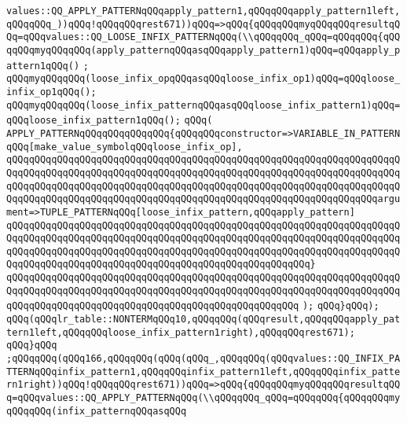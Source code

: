 \verb|values::QQ_APPLY_PATTERNqQQqapply_pattern1,qQQqqQQqapply_pattern1left,qQQqqQQq_))qQQq!qQQqqQQqrest671))qQQq=>qQQq{qQQqqQQqmyqQQqqQQqresultqQQq=qQQqvalues::QQ_LOOSE_INFIX_PATTERNqQQq(\\qQQqqQQq_qQQq=qQQqqQQq{qQQqqQQqmyqQQqqQQq(apply_patternqQQqasqQQqapply_pattern1)qQQq=qQQqapply_pattern1qQQq()|\newline
\verb|;|\newline
\verb|qQQqmyqQQqqQQq(loose_infix_opqQQqasqQQqloose_infix_op1)qQQq=qQQqloose_infix_op1qQQq();|\newline
\verb|qQQqmyqQQqqQQq(loose_infix_patternqQQqasqQQqloose_infix_pattern1)qQQq=qQQqloose_infix_pattern1qQQq();|\newline
\verb|qQQq(|\newline
\verb|APPLY_PATTERNqQQqqQQqqQQqqQQq{qQQqqQQqconstructor=>VARIABLE_IN_PATTERNqQQq[make_value_symbolqQQqloose_infix_op],|\newline
\verb|qQQqqQQqqQQqqQQqqQQqqQQqqQQqqQQqqQQqqQQqqQQqqQQqqQQqqQQqqQQqqQQqqQQqqQQqqQQqqQQqqQQqqQQqqQQqqQQqqQQqqQQqqQQqqQQqqQQqqQQqqQQqqQQqqQQqqQQqqQQqqQQqqQQqqQQqqQQqqQQqqQQqqQQqqQQqqQQqqQQqqQQqqQQqqQQqqQQqqQQqqQQqqQQqqQQqqQQqqQQqqQQqqQQqqQQqqQQqqQQqqQQqqQQqqQQqqQQqqQQqqQQqqQQqqQQqqQQqargument=>TUPLE_PATTERNqQQq[loose_infix_pattern,qQQqapply_pattern]|\newline
\verb|qQQqqQQqqQQqqQQqqQQqqQQqqQQqqQQqqQQqqQQqqQQqqQQqqQQqqQQqqQQqqQQqqQQqqQQqqQQqqQQqqQQqqQQqqQQqqQQqqQQqqQQqqQQqqQQqqQQqqQQqqQQqqQQqqQQqqQQqqQQqqQQqqQQqqQQqqQQqqQQqqQQqqQQqqQQqqQQqqQQqqQQqqQQqqQQqqQQqqQQqqQQqqQQqqQQqqQQqqQQqqQQqqQQqqQQqqQQqqQQqqQQqqQQqqQQqqQQqqQQqqQQq}|\newline
\verb|qQQqqQQqqQQqqQQqqQQqqQQqqQQqqQQqqQQqqQQqqQQqqQQqqQQqqQQqqQQqqQQqqQQqqQQqqQQqqQQqqQQqqQQqqQQqqQQqqQQqqQQqqQQqqQQqqQQqqQQqqQQqqQQqqQQqqQQqqQQqqQQqqQQqqQQqqQQqqQQqqQQqqQQqqQQqqQQqqQQqqQQqqQQqqQQq|\newline
\verb|);|\newline
\verb|qQQq}qQQq);|\newline
\verb|qQQq(qQQqlr_table::NONTERMqQQq10,qQQqqQQq(qQQqresult,qQQqqQQqapply_pattern1left,qQQqqQQqloose_infix_pattern1right),qQQqqQQqrest671);|\newline
\verb|qQQq}qQQq|\newline
\verb|;qQQqqQQq(qQQq166,qQQqqQQq(qQQq(qQQq_,qQQqqQQq(qQQqvalues::QQ_INFIX_PATTERNqQQqinfix_pattern1,qQQqqQQqinfix_pattern1left,qQQqqQQqinfix_pattern1right))qQQq!qQQqqQQqrest671))qQQq=>qQQq{qQQqqQQqmyqQQqqQQqresultqQQq=qQQqvalues::QQ_APPLY_PATTERNqQQq(\\qQQqqQQq_qQQq=qQQqqQQq{qQQqqQQqmyqQQqqQQq(infix_patternqQQqasqQQq|\newline
